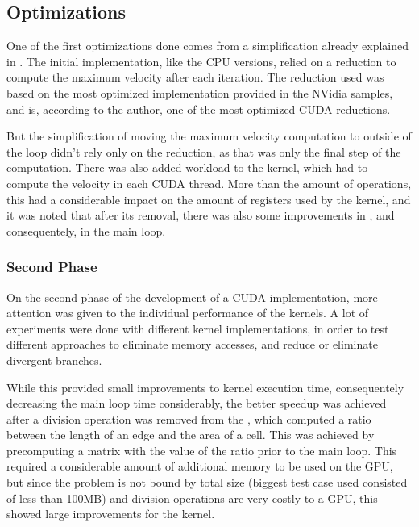\subsection{Optimizations}
\label{subsec:cuda:load}

One of the first optimizations done comes from a simplification already explained in . The initial implementation, like the CPU versions, relied on a reduction to compute the maximum velocity after each iteration. The reduction used was based on the most optimized implementation provided in the NVidia samples, and is, according to the author, one of the most optimized CUDA reductions.

But the simplification of moving the maximum velocity computation to outside of the loop didn't rely only on the reduction, as that was only the final step of the computation. There was also added workload to the \computeflux kernel, which had to compute the velocity in each CUDA thread. More than the amount of operations, this had a considerable impact on the amount of registers used by the kernel, and it was noted that after its removal, there was also some improvements in \computeflux, and consequentely, in the main loop.

\subsubsection{Second Phase}
\label{subsubsec:cuda:load:second}

On the second phase of the development of a CUDA implementation, more attention was given to the individual performance of the kernels. A lot of experiments were done with different kernel implementations, in order to test different approaches to eliminate memory accesses, and reduce or eliminate divergent branches.

While this provided small improvements to kernel execution time, consequentely decreasing the main loop time considerably, the better speedup was achieved after a division operation was removed from the \update, which computed a ratio between the length of an edge and the area of a cell. This was achieved by precomputing a matrix with the value of the ratio prior to the main loop. This required a considerable  amount of additional memory to be used on the GPU, but since the problem is not bound by total size (biggest test case used consisted of less than 100MB) and division operations are very costly to a GPU, this showed large improvements for the \update kernel.

